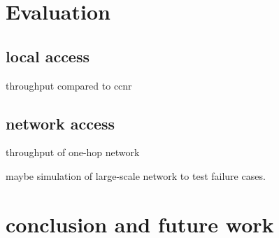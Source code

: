 \documentclass[conference]{IEEEtran}
\begin{document}
\section{Evaluation}

\subsection{local access}
throughput compared to ccnr

\subsection{network access}
throughput of one-hop network

maybe simulation of large-scale network to test failure cases.

\section{conclusion and future work}


\end{document}
